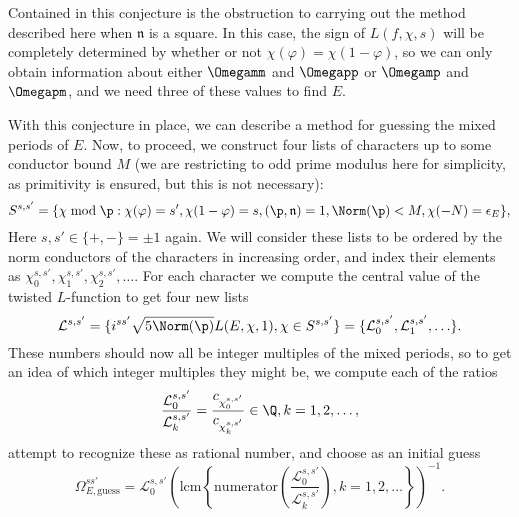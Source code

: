 \documentclass{amsart}
\newcommand{\n}{\mathfrak{n}}
\renewcommand{\phi}{\varphi}
\begin{document}
\begin{remark}
Contained in this conjecture is the obstruction to carrying out the method described here when 
$\n$ is a square. In this case, the sign of $L(f, \chi, s)$ will be completely determined by
whether or not $\chi(\varphi) = \chi(1 - \varphi)$, so we can only obtain information about
either $\Omegamm$ and $\Omegapp$ or $\Omegamp$ and $\Omegapm$, and we need three of these
values to find $E$.
\end{remark}

With this conjecture in place, we can describe a method for guessing the mixed periods of
$E$.
Now, to proceed, we construct four lists of characters
up to some conductor bound $M$ (we are restricting to odd prime modulus here for simplicity,
as primitivity is ensured, but this is not necessary):
\[
    S^{s,s'} = \{ \chi \bmod \p : \chi(\phi) = s', \chi(1 - \phi) = s,
            (\p, \n) = 1, \Norm(\p) < M, \chi(-N) = \epsilon_E\},
\]
Here $s, s' \in \{+, -\} = \pm 1$ again. We will consider these lists to be ordered by the
norm conductors of the characters in increasing order, and index their elements as
$\chi^{s,s'}_0, \chi^{s,s'}_1, \chi^{s,s'}_2, \ldots$. For each character we compute the central
value of the twisted $L$-function to get four new lists
\[
    \mathcal{L}^{s,s'} = \{ i^{ss'}\sqrt{5 \Norm(\p) } L(E,\chi,1), \chi \in S^{s,s'}\} =
        \{\mathcal{L}^{s,s'}_0, \mathcal{L}^{s,s'}_1, \ldots\}.
\]
These numbers should now all be integer multiples of the mixed periods, so to get an idea
of which integer multiples they might be, we compute each of the ratios 
\[
    \frac{\mathcal{L}^{s,s'}_0}{\mathcal{L}^{s,s'}_k} = \frac{c_{\chi^{s,s'}_0}}{c_{\chi^{s,s'}_k}} \in \Q, k = 1, 2, \ldots,
\]
attempt to recognize these as rational number, and 
choose as an initial guess
\[
    \Omega^{ss'}_{E, \mathrm{guess}} = \mathcal{L}^{s,s'}_0\left(\mathrm{lcm}\left\{ \mathrm{numerator}\left(\frac{\mathcal{L}^{s,s'}_0}{\mathcal{L}^{s,s'}_k}\right), k = 1,2, \ldots \right\}\right)^{-1}.
\]
\end{document}
